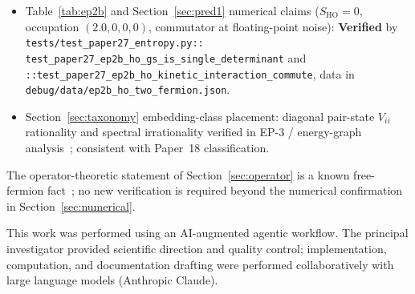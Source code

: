 \documentclass[twocolumn,pra,amsmath,amssymb,superscriptaddress]{revtex4-2}
\begin{document}
\begin{itemize}
    Eq.~\eqref{eq:pred2} (the dimensionless power law
    $S_B = 8.16\,\tilde{w}_B^{2.383}$, $R^{2}=0.998$):
    \textbf{Verified} by
    \texttt{tests/test\_paper27\_entropy.py::\allowbreak
    test\_paper27\_ep2c\_dimensionless\_power\_law},
    data in \texttt{debug/data/ep2c\_entropy\_vs\_vee\_offdiag.json}.
  \item Table~\ref{tab:ep2b} and Section~\ref{sec:pred1}
    numerical claims ($S_{\mathrm{HO}}=0$, occupation
    $(2.0,0,0,0)$, commutator at floating-point noise):
    \textbf{Verified} by
    \texttt{tests/test\_paper27\_entropy.py::\allowbreak
    test\_paper27\_ep2b\_ho\_gs\_is\_single\_determinant}
    and
    \texttt{::test\_paper27\_ep2b\_ho\_kinetic\_interaction\_commute},
    data in \texttt{debug/data/ep2b\_ho\_two\_fermion.json}.
  \item Section~\ref{sec:taxonomy} embedding-class placement:
    diagonal pair-state $V_{ii}$ rationality and spectral
    irrationality verified in EP-3 / energy-graph
    analysis~\cite{EnergyGraph}; consistent with Paper~18
    classification.
\end{itemize}

The operator-theoretic statement of Section~\ref{sec:operator}
is a known free-fermion fact~\cite{Peschel2003}; no new
verification is required beyond the numerical confirmation in
Section~\ref{sec:numerical}.


\begin{acknowledgments}
This work was performed using an AI-augmented agentic workflow.
The principal investigator provided scientific direction and
quality control; implementation, computation, and documentation
drafting were performed collaboratively with large language
models (Anthropic Claude).
\end{acknowledgments}

\end{document}
